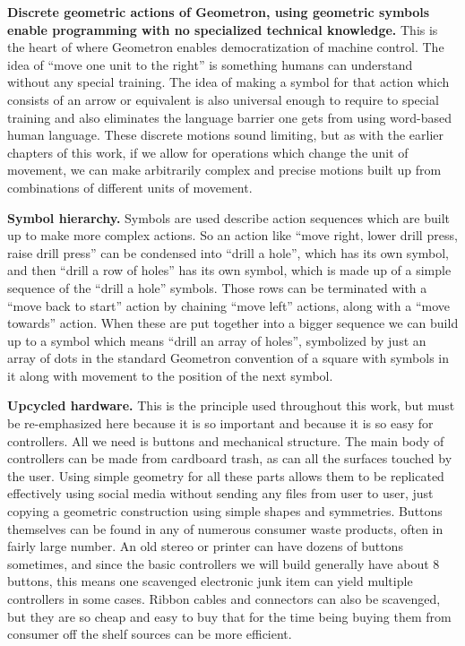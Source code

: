 \textbf{Discrete geometric actions of Geometron, using geometric symbols enable programming with no specialized technical knowledge.}  This is the heart of where Geometron enables democratization of machine control.  The idea of ``move one unit to the right'' is something humans can understand without any special training.  The idea of making a symbol for that action which consists of an arrow or equivalent is also universal enough to require to special training and also eliminates the language barrier one gets from using word-based human language. These discrete motions sound limiting, but as with the earlier chapters of this work, if we allow for operations which change the unit of movement, we can make arbitrarily complex and precise motions built up from combinations of different units of movement.  

\textbf{Symbol hierarchy.}  Symbols are used describe action sequences which are built up to make more complex actions.  So an action like ``move right, lower drill press, raise drill press'' can be condensed into ``drill a hole'', which has its own symbol, and then ``drill a row of holes'' has its own symbol, which is made up of a simple sequence of the ``drill a hole'' symbols.  Those rows can be terminated with a ``move back to start'' action by chaining ``move left'' actions, along with a ``move towards'' action.  When these are put together into a bigger sequence we can build up to a symbol which means ``drill an array of holes'', symbolized by just an array of dots in the standard Geometron convention of a square with symbols in it along with movement to the position of the next symbol.

\textbf{Upcycled hardware.}  This is the principle used throughout this work, but must be re-emphasized here because it is so important and because it is so easy for controllers.  All we need is buttons and mechanical structure.  The main body of controllers can be made from cardboard trash, as can all the surfaces touched by the user.  Using simple geometry for all these parts allows them to be replicated effectively using social media without sending any files from user to user, just copying a geometric construction using simple shapes and symmetries.  Buttons themselves can be found in any of numerous consumer waste products, often in fairly large number.  An old stereo or printer can have dozens of buttons sometimes, and since the basic controllers we will build generally have about 8 buttons, this means one scavenged electronic junk item can yield multiple controllers in some cases.  Ribbon cables and connectors can also be scavenged, but they are so cheap and easy to buy that for the time being buying them from consumer off the shelf sources can be more efficient.

